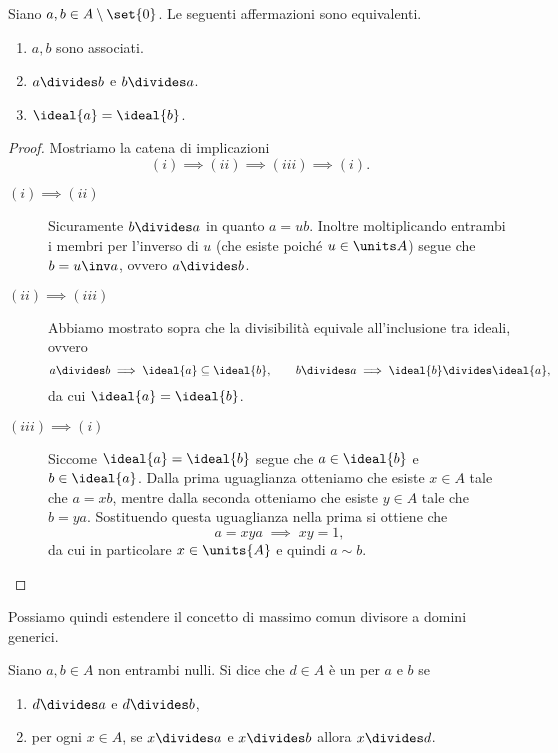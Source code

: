 \begin{proposition}
    \label{prop:caratt_associati}
    Siano $a, b \in A \setminus \set{0}$. Le seguenti affermazioni sono equivalenti.
    \begin{enumerate}[label=({\roman*})]
        \item $a, b$ sono associati.
        \item $a \divides b$ e $b \divides a$.
        \item $\ideal{a} = \ideal{b}$.
    \end{enumerate}
\end{proposition}
\begin{proof}
    Mostriamo la catena di implicazioni \[
        (i) \implies (ii) \implies (iii) \implies (i).    
    \]
    \begin{description}
        \item[$(i) \implies (ii)$] Sicuramente $b \divides a$ in quanto $a = ub$. Inoltre moltiplicando entrambi i membri per l'inverso di $u$ (che esiste poiché $u \in \units A$) segue che $b = u\inv a$, ovvero $a \divides b$.
        \item[$(ii) \implies (iii)$] Abbiamo mostrato sopra che la divisibilità equivale all'inclusione tra ideali, ovvero \[
            a \divides b \implies \ideal{a} \subseteq \ideal{b}, \qquad b \divides a \implies \ideal{b} \divides \ideal{a},    
        \] da cui $\ideal{a} = \ideal{b}$.
        \item[$(iii) \implies (i)$] Siccome $\ideal{a} = \ideal{b}$ segue che $a \in \ideal{b}$ e $b \in \ideal{a}$. Dalla prima uguaglianza otteniamo che esiste $x \in A$ tale che $a = xb$, mentre dalla seconda otteniamo che esiste $y \in A$ tale che $b = ya$. Sostituendo questa uguaglianza nella prima si ottiene che \[
            a = xya \;\implies\; xy = 1,
        \] da cui in particolare $x \in \units{A}$ e quindi $a \sim b$.
    \end{description}
\end{proof}

Possiamo quindi estendere il concetto di massimo comun divisore a domini generici.
\begin{definition}
    Siano $a, b \in A$ non entrambi nulli. Si dice che $d \in A$ è un  per $a$ e $b$ se \begin{enumerate}[label={(\roman*)}]
        \item $d \divides a$ e $d \divides b$,
        \item per ogni $x \in A$, se $x \divides a$ e $x \divides b$ allora $x \divides d$.
    \end{enumerate}
\end{definition}

